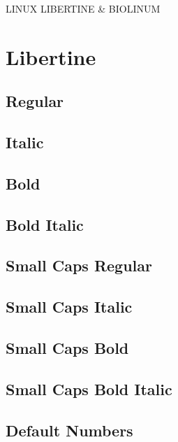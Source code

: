 \documentclass{article}
\begin{document}
\begin{center}\huge
{\libertineDisplay\lsstyle LINUX LIBERTINE \& BIOLINUM}
\end{center}

\tableofcontents

\section{Libertine}

\subsection*{Regular}
\lipsum[1]

\subsection*{Italic}
\textit{\lipsum[2]} 

\subsection*{Bold}
\textbf{\lipsum[3]}

\subsection*{Bold Italic}

\textbf{\textit{\lipsum[4]}}

\subsection*{Small Caps Regular}
\textsc{\lipsum[5]}

\subsection*{Small Caps Italic}
\textsc{\textit{\lipsum[6]}}

\subsection*{Small Caps Bold}
\textsc{\textbf{\lipsum[7]}}

\subsection*{Small Caps Bold Italic}

\textsc{\textbf{\textit{\lipsum[8]}}}

\subsection*{Default Numbers}
\end{document}
